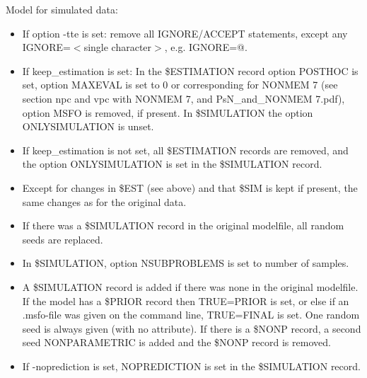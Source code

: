Model for simulated data:
\begin{itemize}
	\item If option -tte is set: remove all  IGNORE/ACCEPT statements, except any IGNORE=$<$single character$>$, e.g. IGNORE=@.
	\item If keep\_estimation is set: In the \$ESTIMATION record option POSTHOC is set, option MAXEVAL is set to 0 or corresponding for  NONMEM 7 (see section npc and vpc with NONMEM 7, and PsN\_and\_NONMEM 7.pdf), option MSFO is removed, if present. In \$SIMULATION the option ONLYSIMULATION is unset.
	\item If keep\_estimation is not set, all \$ESTIMATION records are removed, and the option  ONLYSIMULATION is set in the \$SIMULATION record.
	\item Except for changes in \$EST (see above) and that \$SIM is kept if present, the same changes as for the original data.
	\item If there was a \$SIMULATION record in the original modelfile, all random seeds are replaced.      
	\item In \$SIMULATION, option NSUBPROBLEMS is set to number of samples.
	\item A \$SIMULATION record is added if there was none in the original modelfile. If the model has a \$PRIOR record then TRUE=PRIOR is set, or else if an .msfo-file was given on the command line, TRUE=FINAL is set. One random seed is always given (with no attribute). If there is a \$NONP record, a second seed  NONPARAMETRIC is added and the \$NONP record is removed.
	\item If -noprediction is set, NOPREDICTION is set in the \$SIMULATION record. 
\end{itemize}

